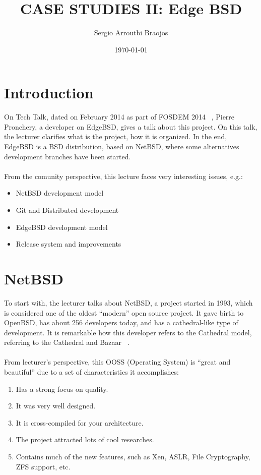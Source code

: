 \documentclass[11pt]{article}
\title{\textbf{CASE STUDIES II: Edge BSD}}
\author{Sergio Arroutbi Braojos}
\date{\today}
\begin{document}
\maketitle

\section{Introduction}
On Tech Talk, dated on February 2014 as part of FOSDEM 2014 ~\cite{FOSS00}, Pierre Pronchery, a developer on EdgeBSD, gives a talk about this project. On this talk, the lecturer clarifies what is the project, how it is organized. In the end, EdgeBSD is a BSD distribution, based on NetBSD, where some alternatives development branches have been started.\\
\\
From the comunity perspective, this lecture faces very interesting issues, e.g.:
\begin{itemize}
\item{NetBSD development model}
\item{Git and Distributed development}
\item{EdgeBSD development model}
\item{Release system and improvements}
\end{itemize}

\section{NetBSD}

To start with, the lecturer talks about NetBSD, a project started in 1993, which is considered one of the oldest ``modern'' open source project. It gave birth to OpenBSD, has about 256 developers today, and has a cathedral-like type of development. It is remarkable how this developer refers to the Cathedral model, referring to the Cathedral and Bazaar ~\cite{CATH00}.\\
\\
From lecturer's perspective, this OOSS (Operating System) is ``great and beautiful'' due to a set of characteristics it accomplishes:
\begin{enumerate}\itemsep0pt
\item{Has a strong focus on quality}.
\item{It was very well designed}.
\item{It is cross-compiled for your architecture}.
\item{The project attracted lots of cool researches}.
\item{Contains much of the new features, such as Xen, ASLR, File Cryptography, ZFS support, etc}.
\end{enumerate}\itemsep0pt
\end{document}
